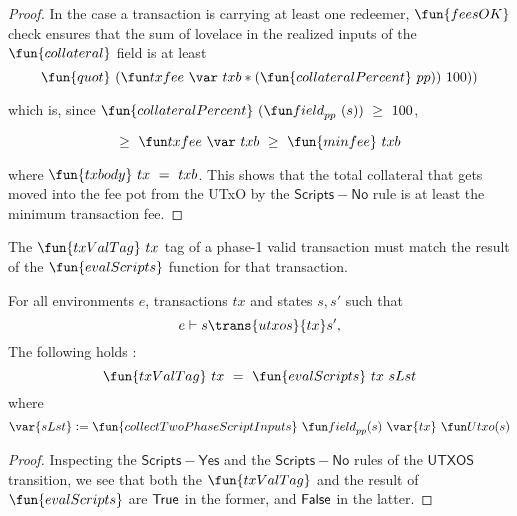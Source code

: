 \begin{property}
\begin{proof}
  In the case a transaction is carrying at least one redeemer, $\fun{feesOK}$ check ensures
  that the sum of lovelace in the realized inputs of the $\fun{collateral}$ field
  is at least
  \[\fun{quot}~(\txfee~{txb} * (\fun{collateralPercent}~pp))~100))\]

  which is, since $\fun{collateralPercent}~(\field_{pp}~(s))~\geq~100$,

  \[ \geq~\txfee~{txb}~\geq~\fun{minfee}~{txb} \]

  where $\fun{txbody}~{tx}~=~{txb}$. This shows that the total collateral that gets
  moved into the fee pot from the UTxO by the $\mathsf{Scripts{-}No}$ rule is at
  least the minimum transaction fee.
\end{proof}
\end{property}

\begin{property}
  \label{prop:correct-tag}

The $\fun{txValTag}~tx$ tag of a phase-1 valid transaction must match the result of the $\fun{evalScripts}$
function for that transaction.

\begin{lemma}
  For all environments $e$, transactions $tx$ and states $s, s'$ such that
  \begin{equation*}
    e\vdash s\trans{utxos}{tx}s',
  \end{equation*}
  The following holds :
    \[\fun{txValTag}~tx ~=~ \fun{evalScripts}~{tx}~{sLst} \]
  where
  \[ \var{sLst} \leteq \fun{collectTwoPhaseScriptInputs} ~\field_{pp}(s)~\var{tx}~ \Utxo(s) \]
\end{lemma}
\begin{proof}
  Inspecting the $\mathsf{Scripts{-}Yes}$ and the $\mathsf{Scripts{-}No}$ rules of the $\mathsf{UTXOS}$ transition,
  we see that both the $\fun{txValTag}$ and the result of $\fun{evalScripts}$
  are $\mathsf{True}$ in the former, and $\mathsf{False}$ in the latter.
\end{proof}
\end{property}

